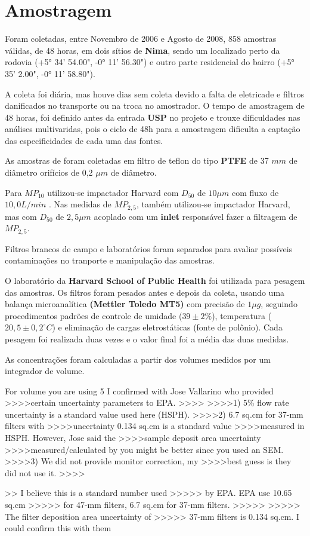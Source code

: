 \section{Amostragem}

Foram coletadas, entre Novembro de 2006 e Agosto de 2008, 858 amostras válidas, 
de 48 horas, em dois sítios de \textbf{Nima}, sendo um localizado perto da rodovia
(+5° 34' 54.00", -0° 11' 56.30") e outro parte residencial do 
bairro (+5° 35' 2.00", -0° 11' 58.80").

A coleta foi diária, mas houve dias sem coleta devido a falta de eletricade e
filtros danificados no transporte ou na troca no amostrador. 
O tempo de amostragem de 48 horas, foi definido antes da entrada \textbf{USP} 
no projeto e trouxe dificuldades nas análises multivaridas, pois o
ciclo de 48h para a amostragem dificulta a captação das especificidades 
de cada uma das fontes.

As amostras de foram coletadas em filtro de teflon do tipo 
\textbf{PTFE} de 37 $mm$ de diâmetro orifícios de 0,2 $\mu m$ de diâmetro. 

Para $MP_{10}$ utilizou-se impactador Harvard com $D_{50}$ de $10 \mu m$ 
com fluxo de $10,0 L/min$ \citep{marple1987}. 
Nas medidas de $MP_{2,5}$, também utilizou-se impactador Harvard, 
mas com $D_{50}$ de $2,5 \mu m$ acoplado com um \textbf{inlet} 
responsável fazer a filtragem de $MP_{2,5}$.

Filtros brancos de campo e laboratórios foram separados para avaliar 
possíveis contaminações no tranporte e manipulação das amostras. 

O laboratório da \textbf{Harvard School of Public Health} foi
utilizada para pesagem das amostras.
Os filtros foram pesados antes e depois da coleta, usando uma balança 
microanalítica \textbf{(Mettler Toledo MT5)} com precisão de $1 \mu g$, 
seguindo procedimentos padrões de controle de umidade ($39 \pm 2 \%$), 
temperatura ($20,5 \pm 0,2 ^{\circ} C$) e eliminação de cargas eletrostáticas 
(fonte de polônio).
Cada pesagem foi realizada duas vezes e o valor final foi a média das 
duas medidas.

As concentrações foram calculadas a partir dos volumes 
medidos por um integrador de volume.

For volume you are using 5%
I confirmed with Jose Vallarino who provided
>>>>certain uncertainty parameters to EPA.
>>>>
>>>>1) 5\% flow rate uncertainty is a standard value used here (HSPH).
>>>>2) 6.7 sq.cm for 37-mm filters with
>>>>uncertainty 0.134 sq.cm is a standard value
>>>>measured in HSPH. However, Jose said the
>>>>sample deposit area uncertainty
>>>>measured/calculated by you might be better since you used an SEM.
>>>>3) We did not provide monitor correction, my
>>>>best guess is they did not use it.
>>>> 

>>  I believe this is a standard number used
>>>>> by EPA. EPA use 10.65 sq.cm
>>>>> for 47-mm filters, 6.7 sq.cm for 37-mm filters.
>>>>>
>>>>>  The filter deposition area uncertainty of
>>>>> 37-mm filters is 0.134 sq.cm. I could confirm this with them 



